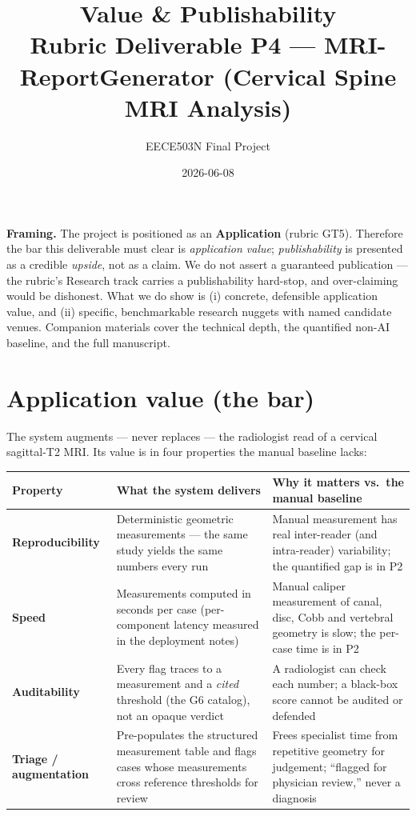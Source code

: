 \documentclass[11pt]{article}
\title{\textbf{Value \& Publishability}\\[2pt]
\large Rubric Deliverable P4 --- MRI-ReportGenerator (Cervical Spine MRI Analysis)}
\author{EECE503N Final Project}
\date{2026-06-08}
\begin{document}
\maketitle

\noindent\textbf{Framing.} The project is positioned as an \textbf{Application} (rubric GT5). Therefore
the bar this deliverable must clear is \emph{application value}; \emph{publishability} is presented as a
credible \emph{upside}, not as a claim. We do not assert a guaranteed publication --- the rubric's
Research track carries a publishability hard-stop, and over-claiming would be dishonest. What we do show
is (i) concrete, defensible application value, and (ii) specific, benchmarkable research nuggets with
named candidate venues. Companion materials cover the technical depth, the quantified non-AI baseline,
and the full manuscript.

\section{Application value (the bar)}
The system augments --- never replaces --- the radiologist read of a cervical sagittal-T2 MRI. Its value
is in four properties the manual baseline lacks:

\begin{table}[h]
\centering\small
\begin{tabularx}{\textwidth}{@{}l Y Y@{}}
\toprule
\textbf{Property} & \textbf{What the system delivers} & \textbf{Why it matters vs.\ the manual baseline} \\
\midrule
\textbf{Reproducibility} & Deterministic geometric measurements --- the same study yields the same
numbers every run & Manual measurement has real inter-reader (and intra-reader) variability; the
quantified gap is in P2 \\
\textbf{Speed} & Measurements computed in seconds per case (per-component latency measured in the
deployment notes) & Manual caliper measurement of canal, disc, Cobb and vertebral geometry is slow;
the per-case time is in P2 \\
\textbf{Auditability} & Every flag traces to a measurement and a \emph{cited} threshold (the G6 catalog),
not an opaque verdict & A radiologist can check each number; a black-box score cannot be audited or
defended \\
\textbf{Triage / augmentation} & Pre-populates the structured measurement table and flags cases whose
measurements cross reference thresholds for review & Frees specialist time from repetitive geometry for
judgement; ``flagged for physician review,'' never a diagnosis \\
\bottomrule
\end{tabularx}
\end{table}
\end{document}
